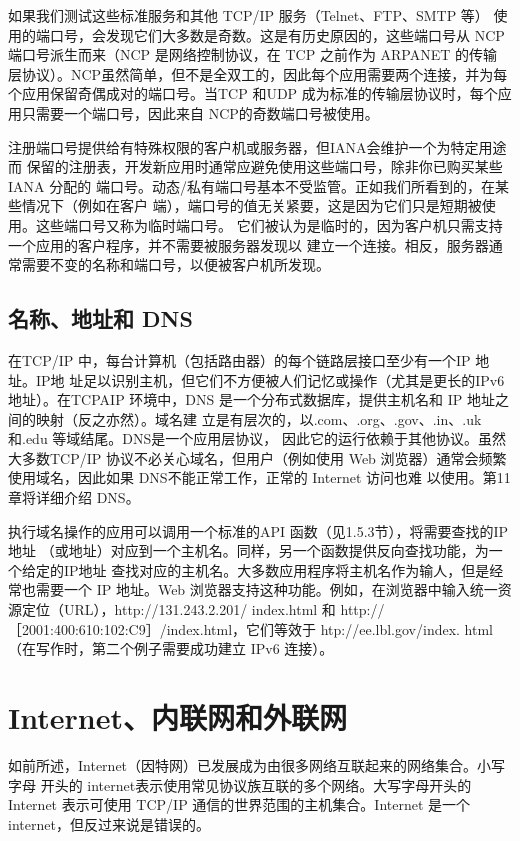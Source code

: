 \begin{tcolorbox}
    如果我们测试这些标准服务和其他 TCP/IP 服务（Telnet、FTP、SMTP 等）
    使用的端口号，会发现它们大多数是奇数。这是有历史原因的，这些端口号从
    NCP 端口号派生而来（NCP 是网络控制协议，在 TCP 之前作为 ARPANET 的传输
    层协议）。NCP虽然简单，但不是全双工的，因此每个应用需要两个连接，并为每
    个应用保留奇偶成对的端口号。当TCP 和UDP 成为标准的传输层协议时，每个应
    用只需要一个端口号，因此来自 NCP的奇数端口号被使用。
\end{tcolorbox}
注册端口号提供给有特殊权限的客户机或服务器，但IANA会维护一个为特定用途而
保留的注册表，开发新应用时通常应避免使用这些端口号，除非你已购买某些IANA 分配的
端口号。动态/私有端口号基本不受监管。正如我们所看到的，在某些情况下（例如在客户
端），端口号的值无关紧要，这是因为它们只是短期被使用。这些端口号又称为临时端口号。
它们被认为是临时的，因为客户机只需支持一个应用的客户程序，并不需要被服务器发现以
建立一个连接。相反，服务器通常需要不变的名称和端口号，以便被客户机所发现。

\subsection{名称、地址和 DNS}
在TCP/IP 中，每台计算机（包括路由器）的每个链路层接口至少有一个IP 地址。IP地
址足以识别主机，但它们不方便被人们记忆或操作（尤其是更长的IPv6地址）。在TCPAIP
环境中，DNS 是一个分布式数据库，提供主机名和 IP 地址之间的映射（反之亦然）。域名建
立是有层次的，以.com、.org、.gov、.in、.uk 和.edu 等域结尾。DNS是一个应用层协议，
因此它的运行依赖于其他协议。虽然大多数TCP/IP 协议不必关心域名，但用户（例如使用
Web 浏览器）通常会频繁使用域名，因此如果 DNS不能正常工作，正常的 Internet 访问也难
以使用。第11 章将详细介绍 DNS。

执行域名操作的应用可以调用一个标准的API 函数（见1.5.3节），将需要查找的IP地址
（或地址）对应到一个主机名。同样，另一个函数提供反向查找功能，为一个给定的IP地址
查找对应的主机名。大多数应用程序将主机名作为输人，但是经常也需要一个 IP 地址。Web
浏览器支持这种功能。例如，在浏览器中输入统一资源定位（URL），http://131.243.2.201/
index.html 和 http://［2001:400:610:102:C9］/index.html，它们等效于 htp://ee.lbl.gov/index.
html（在写作时，第二个例子需要成功建立 IPv6 连接）。

\section{Internet、内联网和外联网}
如前所述，Internet（因特网）已发展成为由很多网络互联起来的网络集合。小写字母
开头的 internet表示使用常见协议族互联的多个网络。大写字母开头的 Internet 表示可使用
TCP/IP 通信的世界范围的主机集合。Internet 是一个 internet，但反过来说是错误的。

